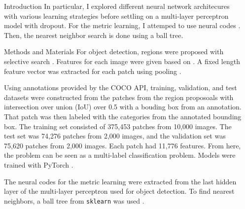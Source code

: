 \documentclass[final]{beamer}
\newlength{\onecolwid}
\newlength{\twocolwid}
\begin{document}
\begin{frame}[t]
\begin{columns}[t]
\begin{column}{\onecolwid}
\begin{block}{Introduction}
  In particular, I explored different neural network architecures with various
  learning strategies before settling on a multi-layer perceptron model with
  dropout. For the metric learning, I attemped to use neural codes
  \citep{neural_codes}. Then, the nearest neighbor search is done using a ball
  tree.
\end{block}

\begin{block}{Methods and Materials}
  For object detection, regions were proposed with selective search
  \citep{selective_search}. Features for each image were given based on
  \cite{fast_rnn}. A fixed length feature vector was extracted for each patch
  using pooling \citep{pooling}.

  Using annotations provided by the COCO API, training, validation, and test
  datasets were constructed from the patches from the region proposoals with
  intersection over union (IoU) over 0.5 with a bouding box from an
  annotation. That patch was then labeled with the categories from the annotated
  bounding box. The training set consisted of 375,453 patches from 10,000
  images. The test set was 74,276 patches from 2,000 images, and the validation
  set was 75,620 patches from 2,000 images. Each patch had 11,776 features. From
  here, the problem can be seen as a multi-label classification problem. Models
  were trained with PyTorch \citep{pytorch}.

  The neural codes for the metric learning were extracted from the last hidden
  layer of the multi-layer perceptron used for object detection. To find nearest
  neighbors, a ball tree from \texttt{sklearn} was used \citep{scikit-learn}.
\end{block}

\end{column} %

\begin{column}{\twocolwid} %

\begin{columns}[t,totalwidth=\twocolwid] %

\begin{column}{\onecolwid}\vspace{-.6in} %



\end{column}
\end{columns}
\end{column}
\end{columns}
\end{frame}
\end{document}
